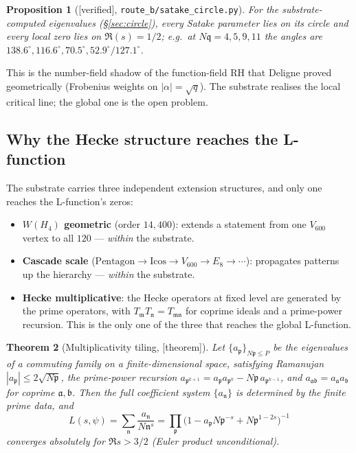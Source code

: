 \documentclass[11pt,a4paper]{article}
\newtheorem{theorem}{Theorem}[section]
\newtheorem{proposition}[theorem]{Proposition}
\theoremstyle{definition}
\newcommand{\TAGthm}{{\small\textsf{[\textcolor{green!45!black}{theorem}]}}}
\newcommand{\TAGver}{{\small\textsf{[\textcolor{blue!60!black}{verified}]}}}
\begin{document}
\begin{proposition}[\TAGver, \texttt{route\_b/satake\_circle.py}]
For the substrate-computed eigenvalues (\S\ref{sec:circle}), every Satake
parameter lies on its circle and every local zero lies on $\Re(s)=1/2$;
e.g.\ at $N\mathfrak{q}=4,5,9,11$ the angles are
$138.6^\circ, 116.6^\circ, 70.5^\circ, 52.9^\circ/127.1^\circ$.
\end{proposition}

This is the number-field shadow of the function-field RH that Deligne proved
geometrically (Frobenius weights on $|\alpha|=\sqrt q$). The substrate
realises the local critical line; the global one is the open problem.

\subsection{Why the Hecke structure reaches the L-function}\label{sec:tilings}
The substrate carries three independent extension structures, and only one
reaches the L-function's zeros:
\begin{itemize}[leftmargin=1.4em]
\item \textbf{$W(H_4)$ geometric} (order $14{,}400$): extends a statement from
one $V_{600}$ vertex to all $120$ --- \emph{within} the substrate.
\item \textbf{Cascade scale} ($\mathrm{Pentagon}\!\to\!\mathrm{Icos}\!\to\!
V_{600}\!\to\!E_8\!\to\!\cdots$): propagates patterns up the hierarchy ---
\emph{within} the substrate.
\item \textbf{Hecke multiplicative}: the Hecke operators at fixed level are
generated by the prime operators, with $T_\mathfrak{m}T_\mathfrak{n}=
T_{\mathfrak{m}\mathfrak{n}}$ for coprime ideals and a prime-power recursion.
This is the only one of the three that reaches the global L-function.
\end{itemize}

\begin{theorem}[Multiplicativity tiling, \TAGthm]\label{thm:tiling}
Let $\{a_\mathfrak{p}\}_{N\mathfrak{p}\le P}$ be the eigenvalues of a commuting
family on a finite-dimensional space, satisfying Ramanujan
$|a_\mathfrak{p}|\le2\sqrt{N\mathfrak{p}}$, the prime-power recursion
$a_{\mathfrak{p}^{k+1}}=a_\mathfrak{p}a_{\mathfrak{p}^k}-N\mathfrak{p}\,
a_{\mathfrak{p}^{k-1}}$, and $a_{\mathfrak{a}\mathfrak{b}}=a_\mathfrak{a}
a_\mathfrak{b}$ for coprime $\mathfrak{a},\mathfrak{b}$. Then the full
coefficient system $\{a_\mathfrak{n}\}$ is determined by the finite prime data,
and
$$L(s,\psi)=\sum_\mathfrak{n}\frac{a_\mathfrak{n}}{N\mathfrak{n}^{s}}
=\prod_\mathfrak{p}\bigl(1-a_\mathfrak{p}N\mathfrak{p}^{-s}
+N\mathfrak{p}^{1-2s}\bigr)^{-1}$$
converges absolutely for $\Re s>3/2$ (Euler product unconditional).
\end{theorem}
\end{document}
